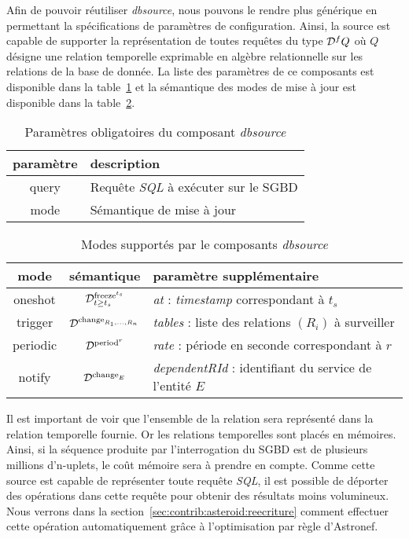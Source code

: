Afin de pouvoir réutiliser \textit{dbsource}, nous pouvons le rendre plus générique en permettant la spécifications de paramètres de configuration. Ainsi, la source est capable de supporter la représentation de toutes requêtes du type $\mathcal{D}^f Q$ où $Q$ désigne une relation temporelle exprimable en algèbre relationnelle sur les relations de la base de donnée. La liste des paramètres de ce composants est disponible dans la table~\ref{tab:contrib:asteroid:dbsource} et la sémantique des modes de mise à jour est disponible dans la table~\ref{tab:contrib:asteroid:dbsource:modes}.
\begin{table}[ht]
    \centering
    \begin{tabular}{cl}
        paramètre & description \\ \midrule
        query & Requête \textit{SQL} à exécuter sur le SGBD \\
        mode & Sémantique de mise à jour
    \end{tabular}
    \caption{Paramètres obligatoires du composant \textit{dbsource}}\label{tab:contrib:asteroid:dbsource}
\end{table}
\begin{table}[ht]
    \centering
    \begin{tabular}{ccl}
        mode & sémantique & paramètre supplémentaire \\ \midrule
        oneshot & $\mathcal{D}^{\mathrm{freeze}^{t_s}}_{t\geq t_s}$ & \textit{at} : \textit{timestamp} correspondant à $t_s$\\
        trigger & $\mathcal{D}^{\mathrm{change}_{R_1,...,R_n}}$ & \textit{tables} : liste des relations $(R_i)$ à surveiller \\
        periodic & $\mathcal{D}^{\mathrm{period}^{r}}$ & \textit{rate} : période en seconde correspondant à $r$\\
        notify & $\mathcal{D}^{\mathrm{change}_{E}}$ & \textit{dependentRId} : identifiant du service de l'entité $E$
    \end{tabular}
    \caption{Modes supportés par le composants \textit{dbsource}}\label{tab:contrib:asteroid:dbsource:modes}
\end{table}

Il est important de voir que l'ensemble de la relation sera représenté dans la relation temporelle fournie. Or les relations temporelles sont placés en mémoires. Ainsi, si la séquence produite par l'interrogation du SGBD est de plusieurs millions d'n-uplets, le coût mémoire sera à prendre en compte. Comme cette source est capable de représenter toute requête \textit{SQL}, il est possible de déporter des opérations dans cette requête pour obtenir des résultats moins volumineux. Nous verrons dans la section~\ref{sec:contrib:asteroid:reecriture} comment effectuer cette opération automatiquement grâce à l'optimisation par règle d'Astronef.

